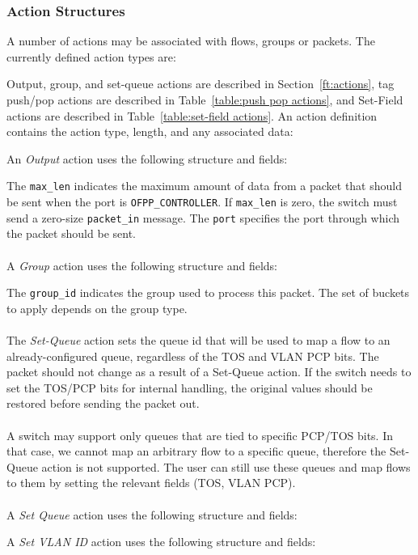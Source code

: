 \subsubsection{Action Structures}
\label{sec:action structure}
A number of actions may be associated with flows, groups or packets.  The currently defined action types are:

 
Output, group, and set-queue actions are described in Section~\ref{ft:actions}, tag push/pop actions are described in Table~\ref{table:push pop actions}, and Set-Field actions are described in Table~\ref{table:set-field actions}.  An action definition contains the action type, length, and any associated data:


An \emph{Output} action uses the following structure and fields:


The \verb|max_len| indicates the maximum amount of data from a packet that should be sent when the port is \verb|OFPP_CONTROLLER|.  If \verb|max_len| is zero, the switch must send a zero-size \verb|packet_in| message.  The \verb|port| specifies the port through which the packet should be sent.
\\\\
A \emph{Group} action uses the following structure and fields:


The \verb|group_id| indicates the group used to process this packet.  The set of buckets to apply depends on the group type.
\\\\
The \emph{Set-Queue} action sets the queue id that will be used to map a flow to an already-configured queue, regardless of the TOS and VLAN PCP bits. The packet should not change as a result of a Set-Queue action. If the switch needs to set the TOS/PCP bits for internal handling, the original values should be restored before sending the packet out.
\\\\
A switch may support only queues that are tied to specific PCP/TOS bits. In that case, we cannot map an arbitrary flow to a specific queue, therefore the Set-Queue action is not supported. The user can still use these queues and map flows to them by setting the relevant fields (TOS, VLAN PCP).
\\\\
A \emph{Set Queue} action uses the following structure and fields:


A \emph{Set VLAN ID} action uses the following structure and fields:

